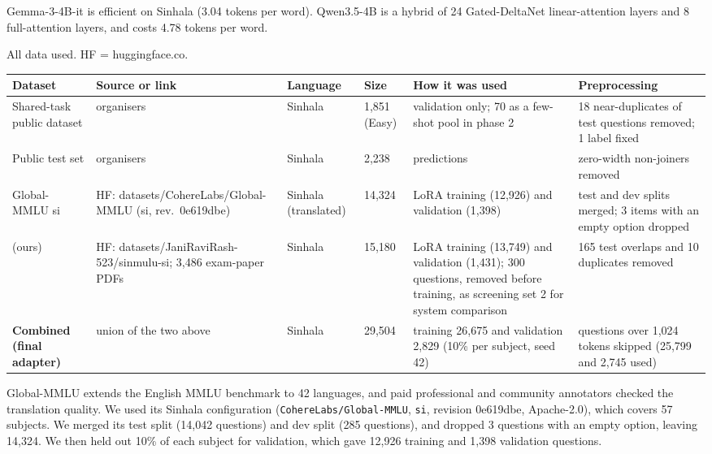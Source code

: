 Gemma-3-4B-it is efficient on Sinhala (3.04 tokens per word). Qwen3.5-4B is a hybrid of 24 Gated-DeltaNet linear-attention layers and 8 full-attention layers, and costs 4.78 tokens per word.

\clearpage
\begin{center}\captionsetup{type=table}
\small
\caption{All data used. HF = huggingface.co.}\label{tab:data}
\begin{tabularx}{\textwidth}{@{}L{0.16\textwidth}L{0.26\textwidth}L{0.08\textwidth}L{0.07\textwidth}YL{0.2\textwidth}@{}}
\toprule
Dataset & Source or link & Language & Size & How it was used & Preprocessing \\
\midrule
Shared-task public dataset & organisers & Sinhala & 1,851 (Easy) & validation only; 70 as a few-shot pool in phase 2 & 18 near-duplicates of test questions removed; 1 label fixed \\
Public test set & organisers & Sinhala & 2,238 & predictions & zero-width non-joiners removed \\
Global-MMLU si \citep{singh2025globalmmlu} & HF: datasets/CohereLabs/Global-MMLU (si, rev.\ 0e619dbe) & Sinhala (translated) & 14,324 & LoRA training (12,926) and validation (1,398) & test and dev splits merged; 3 items with an empty option dropped \\
\sinmulu{} (ours) & HF: datasets/JaniRaviRash-523/sinmulu-si; 3,486 exam-paper PDFs & Sinhala & 15,180 & LoRA training (13,749) and validation (1,431); 300 questions, removed before training, as screening set 2 for system comparison & 165 test overlaps and 10 duplicates removed \\
\textbf{Combined (final adapter)} & union of the two above & Sinhala & 29,504 & training 26,675 and validation 2,829 (10\% per subject, seed 42) & questions over 1,024 tokens skipped (25,799 and 2,745 used) \\
\bottomrule
\end{tabularx}
\end{center}

 Global-MMLU \citep{singh2025globalmmlu} extends the English MMLU benchmark to 42 languages, and paid professional and community annotators checked the translation quality. We used its Sinhala configuration (\texttt{CohereLabs/Global-MMLU}, \texttt{si}, revision 0e619dbe, Apache-2.0), which covers 57 subjects. We merged its test split (14,042 questions) and dev split (285 questions), and dropped 3 questions with an empty option, leaving 14,324. We then held out 10\% of each subject for validation, which gave 12,926 training and 1,398 validation questions.

